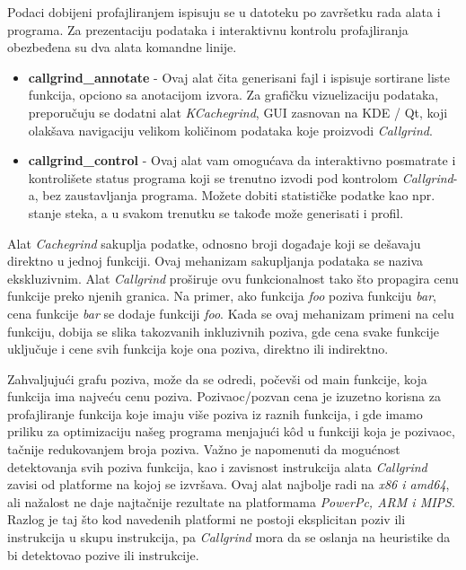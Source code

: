\documentclass[12pt,oneside]{memoir}
\theoremstyle{plain}
\theoremstyle{definition}
\begin{document}
Podaci dobijeni profajliranjem ispisuju se u datoteku po završetku rada alata i programa. Za prezentaciju podataka i interaktivnu kontrolu profajliranja obezbeđena su dva alata komandne linije.
\begin{itemize}
\item \textbf{callgrind\_annotate} - Ovaj alat čita generisani fajl i ispisuje sortirane liste funkcija, opciono sa anotacijom izvora. Za grafičku vizuelizaciju podataka, preporučuju se dodatni alat \textit{KCachegrind}, GUI zasnovan na KDE / Qt, koji olakšava navigaciju velikom količinom podataka koje proizvodi \textit{Callgrind}.
\item \textbf{callgrind\_control} - Ovaj alat vam omogućava da interaktivno posmatrate i kontrolišete status programa koji se trenutno izvodi pod kontrolom \textit{Callgrind}-a, bez zaustavljanja programa. Možete dobiti statističke podatke kao npr. stanje steka, a u svakom trenutku se takođe može generisati i profil.
\end{itemize}

Alat \textit{Cachegrind} sakuplja podatke, odnosno broji događaje koji se dešavaju direktno u jednoj funkciji. Ovaj mehanizam sakupljanja podataka se naziva ekskluzivnim. Alat \textit{Callgrind} proširuje ovu funkcionalnost tako što propagira cenu funkcije preko njenih granica. Na primer, ako funkcija \textit{foo} poziva funkciju \textit{bar}, cena funkcije \textit{bar} se dodaje funkciji \textit{foo}. Kada se ovaj mehanizam primeni na celu funkciju, dobija se slika takozvanih inkluzivnih poziva, gde cena svake funkcije uključuje i cene svih funkcija koje ona poziva, direktno ili indirektno.

Zahvaljujući grafu poziva, može da se odredi, počevši od main funkcije, koja funkcija ima najveću cenu poziva. Pozivaoc/pozvan cena je izuzetno korisna za profajliranje funkcija koje imaju više poziva iz raznih funkcija, i gde imamo priliku za optimizaciju našeg programa menjajući k\^od u funkciji koja je pozivaoc, tačnije redukovanjem broja poziva. Važno je napomenuti da mogućnost detektovanja svih poziva funkcija, kao i zavisnost instrukcija alata \textit{Callgrind} zavisi od platforme na kojoj se izvršava. Ovaj alat najbolje radi na \textit{x86 i amd64}, ali nažalost ne daje najtačnije rezultate na platformama \textit{PowerPc, ARM i MIPS}. Razlog je taj što kod navedenih platformi ne postoji eksplicitan poziv ili instrukcija u skupu instrukcija, pa \textit{Callgrind} mora da se oslanja na heuristike da bi detektovao pozive ili instrukcije.
\end{document}
